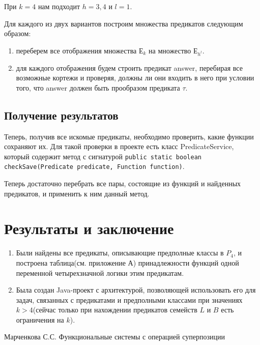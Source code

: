 \documentclass[a4paper,14pt]{extreport}
\begin{document}
При $k=4$ нам подходит $h=3,4$ и $l =1$.

Для каждого из двух вариантов построим множества предикатов следующим образом:
\begin{enumerate}
\item переберем все отображения множества $Е_k$ на  множество $Е_{h^l}$.
\item для каждого отображения будем строить предикат answer, перебирая все возможные кортежи и проверяя, должны ли они входить в него при условии того, что answer должен быть прообразом предиката $\tau$.
\end{enumerate} 
\section{Получение результатов}
Теперь, получив все искомые предикаты, необходимо проверить, какие функции сохраняют их. Для такой проверки в проекте есть класс PredicateService, который содержит метод с сигнатурой {\tt public static boolean checkSave(Predicate predicate, Function function)}. 

Теперь достаточно перебрать все пары, состоящие из функций и найденных предикатов, и применить к ним данный метод.

\chapter{Результаты и заключение}
\begin{enumerate}
\item Были найдены все предикаты, описывающие предполные классы в $P_4$, и построена таблица(см. приложение А) принадлежности функций одной переменной четырехзначной логики этим предикатам. 
\item Была создан Java-проект с архитектурой, позволяющей использовать его для задач, связанных с предикатами и предполными классами при значениях $k>4$(сейчас только при нахождении предикатов семейств $L$ и $B$ есть ограничения на $k$).
\end{enumerate}


\newpage
{}
\begin{thebibliography}{9}
 Марченкова С.С. Функциональные системы с операцией суперпозиции
\end{thebibliography}
\end{document}
